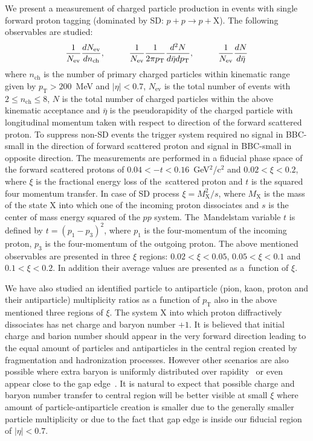 We present a measurement of charged particle production in events with single forward proton tagging (dominated by \ac{SD}: $p+p\to p+\textrm{X}$). The following observables are studied:
\begin{equation}
\frac{1}{N_\textrm{ev}}\frac{dN_\textrm{ev}}{dn_\textrm{ch}},\textrm{\hspace{1cm}} 
\frac{1}{N_\textrm{ev}}\frac{1}{2\pi p_\textrm{T}}\frac{d^2N}{d\bar{\eta}dp_\textrm{T}},\textrm{\hspace{1cm}} 
\frac{1}{N_\textrm{ev}}\frac{dN}{d\bar{\eta}}
\end{equation}
where $n_\textrm{ch}$ is the number of primary charged particles within kinematic range given by $p_\textrm{T}>200$~MeV and $|\eta|<0.7$, $N_\textrm{ev}$ is the 
total number of events with $2\leq n_\textrm{ch}\leq8$, $N$ is the total number of charged particles within the above kinematic acceptance and $\bar{\eta}$ is the pseudorapidity of the charged particle with longitudinal momentum taken with respect to direction of the forward scattered proton. To suppress non-SD events the trigger system required no signal in BBC-small in the direction of forward scattered proton and signal in BBC-small in opposite direction. The 
measurements are performed in a fiducial phase space of the forward scattered protons of $0.04<-t<0.16$~GeV$^2$/c$^2$ and 
$0.02<\xi<0.2$, where $\xi$ is the fractional energy loss of the~scattered proton and $t$ is the squared four momentum transfer. In case of SD process $\xi=M^2_\textrm{X}/s$, where $M_\textrm{X}$ is 
the mass of the state $\textrm{X}$ into which one of the incoming proton dissociates and $s$ is the center of mass energy squared of the $pp$ system. The~Mandelstam variable $t$ is defined by $t=(p_1-p_3)^2$,  where $p_1$ is the four-momentum of the incoming proton, $p_3$ is the four-momentum of the outgoing proton. The above mentioned observables are presented in three $\xi$ 
regions: $0.02<\xi<0.05$, $0.05<\xi<0.1$ and $0.1<\xi<0.2$. In addition their average values are presented as a~function of $\xi$.



We have also studied an identified particle to antiparticle (pion, kaon, proton and their antiparticle) multiplicity ratios as a function of $p_\textrm{T}$ also in the above mentioned three regions of $\xi$. The system $\textrm{X}$ into which proton diffractively dissociates has net charge and baryon number $+1$. It is believed that initial charge and barion number should appear in the very forward direction leading to the equal amount of particles and antiparticles in the central region created by fragmentation and hadronization processes. However other scenarios are also possible where extra baryon is uniformly distributed over rapidity~\cite{Kopeliovich:1988qm} or even appear close to the gap edge~\cite{Bopp:2000vg}. It is natural to expect that possible charge and baryon number transfer to central region will be better visible at small $\xi$ where amount of particle-antiparticle creation is smaller due to the generally smaller particle multiplicity or due to the fact that gap edge is inside our fiducial region of $|\eta|<0.7$.
